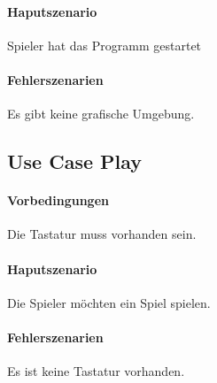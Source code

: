 \documentclass[a4paper, twosided, 11pt]{scrartcl}
\begin{document}
\paragraph{Haputszenario} Spieler hat das Programm gestartet
\paragraph{Fehlerszenarien} Es gibt keine grafische Umgebung.

\subsection{Use Case Play}
\paragraph{Vorbedingungen} Die Tastatur muss vorhanden sein.
\paragraph{Haputszenario} Die Spieler möchten ein Spiel spielen.
\paragraph{Fehlerszenarien} Es ist keine Tastatur vorhanden.
\end{document}
